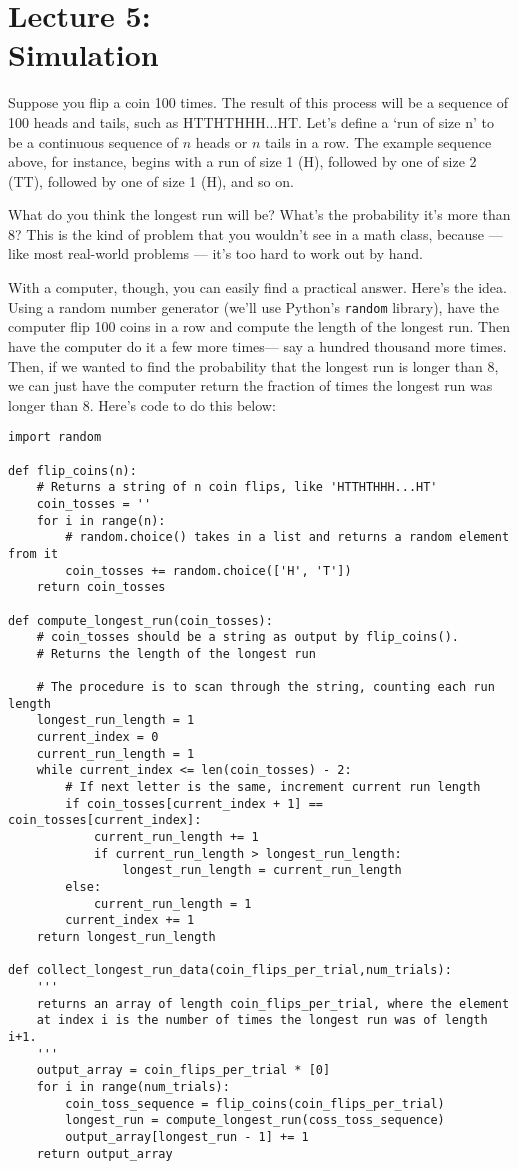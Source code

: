 \part*{Lecture 5: \\Simulation}

Suppose you flip a coin 100 times. The result of this process will be a sequence of 100 heads and tails, such as HTTHTHHH...HT. Let's define a `run of size n' to be a continuous sequence of $n$ heads or $n$ tails in a row. The example sequence above, for instance, begins with a run of size 1 (H), followed by one of size 2 (TT), followed by one of size 1 (H), and so on.

What do you think the longest run will be? What's the probability it's more than 8? This is the kind of problem that you wouldn't see in a math class, because --- like most real-world problems --- it's too hard to work out by hand.

With a computer, though, you can easily find a practical answer. Here's the idea. Using a random number generator (we'll use Python's \texttt{random} library), have the computer flip 100 coins in a row and compute the length of the longest run. Then have the computer do it a few more times--- say a hundred thousand more times. Then, if we wanted to find the probability that the longest run is longer than 8, we can just have the computer return the fraction of times the longest run was longer than 8. Here's code to do this below:

\begin{lstlisting}
import random

def flip_coins(n): 
	# Returns a string of n coin flips, like 'HTTHTHHH...HT'
	coin_tosses = ''
	for i in range(n):
		# random.choice() takes in a list and returns a random element from it
		coin_tosses += random.choice(['H', 'T']) 
	return coin_tosses

def compute_longest_run(coin_tosses): 
	# coin_tosses should be a string as output by flip_coins(). 
	# Returns the length of the longest run
	
	# The procedure is to scan through the string, counting each run length
	longest_run_length = 1
	current_index = 0
	current_run_length = 1
	while current_index <= len(coin_tosses) - 2:
		# If next letter is the same, increment current run length
		if coin_tosses[current_index + 1] == coin_tosses[current_index]: 
			current_run_length += 1
			if current_run_length > longest_run_length:
				longest_run_length = current_run_length
		else:
			current_run_length = 1
		current_index += 1
	return longest_run_length

def collect_longest_run_data(coin_flips_per_trial,num_trials): 
	'''
	returns an array of length coin_flips_per_trial, where the element 
	at index i is the number of times the longest run was of length i+1.
	'''	
	output_array = coin_flips_per_trial * [0]
	for i in range(num_trials):
		coin_toss_sequence = flip_coins(coin_flips_per_trial)
		longest_run = compute_longest_run(coss_toss_sequence)
		output_array[longest_run - 1] += 1
	return output_array
\end{lstlisting}

